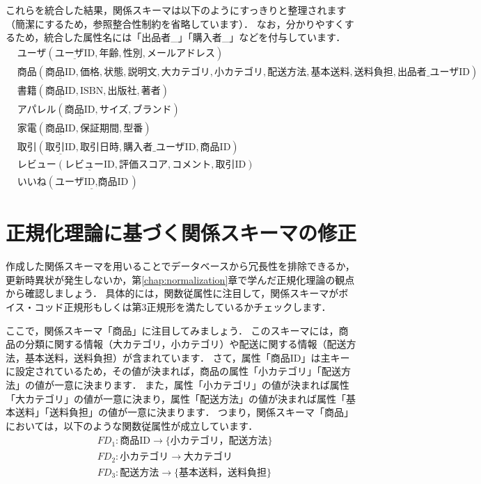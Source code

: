 これらを統合した結果，関係スキーマは以下のようにすっきりと整理されます（簡潔にするため，参照整合性制約を省略しています）．
なお，分かりやすくするため，統合した属性名には「出品者\_」「購入者\_」などを付与しています．
\begin{align}
&\textbf{ユーザ}(\underline{\text{ユーザID}}, \text{年齢}, \text{性別}, \text{メールアドレス}) \\
&\textbf{商品}(\underline{\text{商品ID}}, \text{価格}, \text{状態}, \text{説明文}, \text{大カテゴリ}, \text{小カテゴリ}, \text{配送方法}, \text{基本送料}, \text{送料負担}, \text{出品者\_ユーザID}) \\
&\textbf{書籍}(\underline{\text{商品ID}}, \text{ISBN}, \text{出版社}, \text{著者}) \\
&\textbf{アパレル}(\underline{\text{商品ID}}, \text{サイズ}, \text{ブランド}) \\
&\textbf{家電}(\underline{\text{商品ID}}, \text{保証期間}, \text{型番}) \\
&\textbf{取引}(\underline{\text{取引ID}}, \text{取引日時}, \text{購入者\_ユーザID}, \text{商品ID}) \\
&\textbf{レビュー}(\underline{\text{レビューID}}, \text{評価スコア}, \text{コメント}, \text{取引ID}) \\
&\textbf{いいね}(\underline{\text{ユーザID}, \text{商品ID}})
\end{align}


\section{正規化理論に基づく関係スキーマの修正}
作成した関係スキーマを用いることでデータベースから冗長性を排除できるか，更新時異状が発生しないか，第\ref{chap:normalization}章で学んだ正規化理論の観点から確認しましょう．
具体的には，関数従属性に注目して，関係スキーマがボイス・コッド正規形もしくは第3正規形を満たしているかチェックします．

ここで，関係スキーマ「商品」に注目してみましょう．
このスキーマには，商品の分類に関する情報（大カテゴリ，小カテゴリ）や配送に関する情報（配送方法，基本送料，送料負担）が含まれています．
さて，属性「商品ID」は主キーに設定されているため，その値が決まれば，商品の属性「小カテゴリ」「配送方法」の値が一意に決まります．
また，属性「小カテゴリ」の値が決まれば属性「大カテゴリ」の値が一意に決まり，属性「配送方法」の値が決まれば属性「基本送料」「送料負担」の値が一意に決まります．
つまり，関係スキーマ「商品」においては，以下のような関数従属性が成立しています．
\begin{align}
&FD_1: \text{商品ID} \to \text{\{小カテゴリ，配送方法\}} \\
&FD_2: \text{小カテゴリ} \to \text{大カテゴリ} \\
&FD_3: \text{配送方法} \to  \text{\{基本送料，送料負担\}}
\end{align}

